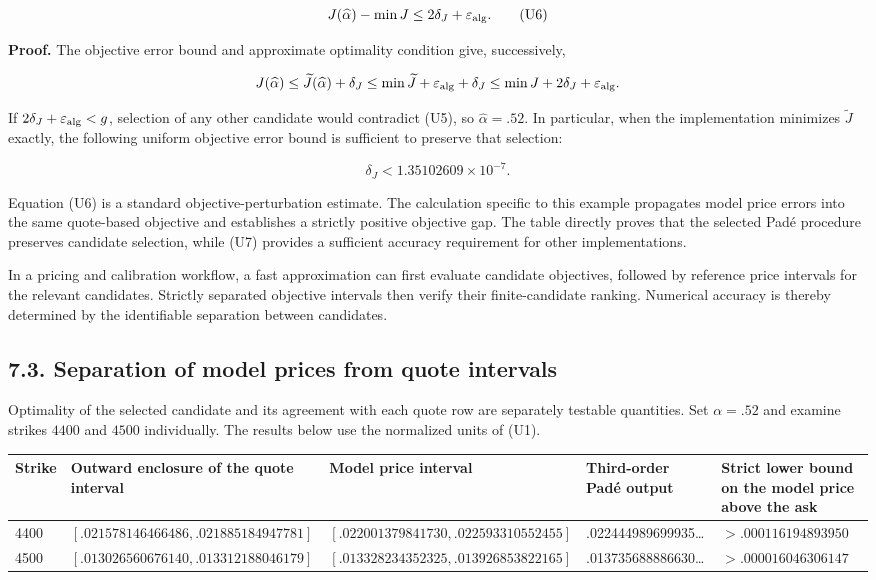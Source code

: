 \documentclass[a4paper,11pt]{article}
\begin{document}
\[
J(\widehat\alpha)-\min J
\le2\delta_J+\varepsilon_{\rm alg}.
\tag{U6}
\]

\textbf{Proof.} The objective error bound and approximate optimality condition give, successively,

\[
J(\widehat\alpha)
\le\widetilde J(\widehat\alpha)+\delta_J
\le\min\widetilde J+\varepsilon_{\rm alg}+\delta_J
\le\min J+2\delta_J+\varepsilon_{\rm alg}.
\]

If $2\delta_J+\varepsilon_{\rm alg}<g$, selection of any other candidate would contradict (U5), so $\widehat\alpha=.52$. In particular, when the implementation minimizes $\widetilde J$ exactly, the following uniform objective error bound is sufficient to preserve that selection:

\[
\delta_J<1.35102609\times10^{-7}.
\tag{U7}
\]

Equation (U6) is a standard objective-perturbation estimate. The calculation specific to this example propagates model price errors into the same quote-based objective and establishes a strictly positive objective gap. The table directly proves that the selected Padé procedure preserves candidate selection, while (U7) provides a sufficient accuracy requirement for other implementations.

In a pricing and calibration workflow, a fast approximation can first evaluate candidate objectives, followed by reference price intervals for the relevant candidates. Strictly separated objective intervals then verify their finite-candidate ranking. Numerical accuracy is thereby determined by the identifiable separation between candidates.

\subsection*{7.3. Separation of model prices from quote intervals}

Optimality of the selected candidate and its agreement with each quote row are separately testable quantities. Set $\alpha=.52$ and examine strikes $4400$ and $4500$ individually. The results below use the normalized units of (U1).

\begingroup\scriptsize\setlength{\tabcolsep}{3pt}
\begin{longtable}{L{0.178000\textwidth}L{0.178000\textwidth}L{0.178000\textwidth}L{0.178000\textwidth}L{0.178000\textwidth}}
Strike & Outward enclosure of the quote interval & Model price interval & Third-order Padé output & Strict lower bound on the model price above the ask\\
 & $[.021578146466486,.021885184947781]$ & $[.022001379841730,.022593310552455]$ & .022444989699935… & $>.000116194893950$\\
4500 & $[.013026560676140,.013312188046179]$ & $[.013328234352325,.013926853822165]$ & .013735688886630… & $>.000016046306147$\\
\end{longtable}\endgroup
\end{document}
